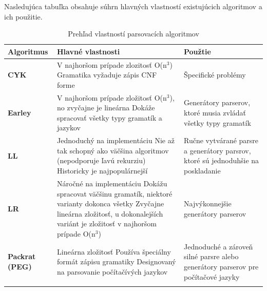 Nasledujúca tabuľka obsahuje súhrn hlavných vlastností existujúcich algoritmov a ich použitie\cite{tomassetti:parsing}.

\begin{longtable}{|p{2.5cm}|p{6cm}|p{5.5cm}|}
\hline
\textbf{Algoritmus}    & \textbf{Hlavné vlastnosti}    						& \textbf{Použtie} \\ \hline
\textbf{CYK} \cite{CYK} & V najhoršom prípade zlozitosť O(n$^3$)\newline 
						Gramatika vyžaduje zápis CNF forme					& Špecifické problémy \\ \hline
                        
\textbf{Earley}
\cite{earley}		  & V najhoršom prípade zložitosť O(n$^3$), 
						no zvyčajne je lineárna\newline 
                        Dokáže spracovať všetky typy gramatík a jazykov		& Generátory parserov, ktoré musia 
                                                                              zvládať všetky typy gramatík  \\ \hline
                                                                              
  \textbf{LL} \cite{LL} & Jednoduchý na implementáciu \newline 
						 Nie až tak schopný ako väčšina algoritmov 
                         (nepodporuje ľavú rekurziu) \newline 
                         Historicky je najpopulárnejší						& Ručne vytvárané parsre a generátory 
                        													  parsrov, ktoré sú jednoduhšie na poskladanie  \\ \hline
                                                                              
\textbf{LR} \cite{LR}   & Náročné na implementáciu \newline 
						 Dokážu spracovat väčšinu gramatík, niektoré 
                         varianty dokonca všetky\newline 
                         Zvyčajne lineárna zložitosť, u dokonalejších 
                         variánt je zložitosť v najhoršom prípade O(n$^3$)		& Najvýkonnejšie generátory parserov \\ \hline
                         
\textbf{Packrat (PEG)}
\cite{Packrat}			& Lineárna zložitosť\newline 
						 Používa špeciálny formát zápisu gramatiky\newline 
                         Designovaný na parsovanie počítačívých jazykov		& Jednoduché a zároveň silné parsre alebo 
                         													  generátory parserov pre počítačové jazyky \\ \hline         
\caption{Prehľad vlastností parsovacích algoritmov}
\label{my-label}
\end{longtable}


